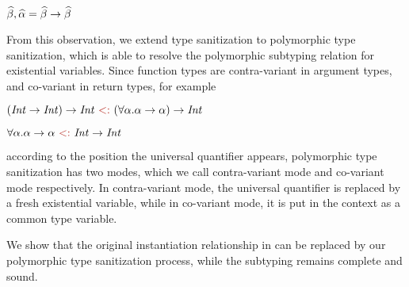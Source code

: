 $\widehat{\beta}, \widehat{\alpha} = \widehat{\beta} \to \widehat{\beta}$

From this observation, we extend type sanitization to polymorphic type
sanitization, which is able to resolve the polymorphic subtyping relation for
existential variables. Since function types are contra-variant in argument
types, and co-variant in return types, for example

$(\Int \to \Int) \to \Int \tsub (\forall \varA. \varA \to \varA) \to \Int $

$\forall \varA. \varA \to \varA \tsub \Int \to \Int$

\noindent according to the position the universal
quantifier appears, polymorphic type sanitization has two modes, which we call
contra-variant mode and co-variant mode respectively.
In contra-variant mode, the universal quantifier is replaced by a fresh
existential variable, while in co-variant mode, it is put in the context as a
common type variable.

We show that the original instantiation relationship in
\citet{dunfield2013complete} can be replaced by our polymorphic type
sanitization process, while the subtyping remains complete and sound.

